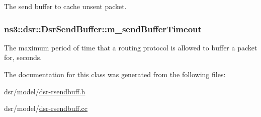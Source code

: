 The send buffer to cache unsent packet. 

\subsubsection[{\texorpdfstring{m\+\_\+send\+Buffer\+Timeout}{m_sendBufferTimeout}}]{ ns3\+::dsr\+::\+Dsr\+Send\+Buffer\+::m\+\_\+send\+Buffer\+Timeout\hspace{0.3cm}{\ttfamily [private]}}\hypertarget{classns3_1_1dsr_1_1DsrSendBuffer_a69009e6cefeda83be7eada52fdc8680e}{}\label{classns3_1_1dsr_1_1DsrSendBuffer_a69009e6cefeda83be7eada52fdc8680e}


The maximum period of time that a routing protocol is allowed to buffer a packet for, seconds. 



The documentation for this class was generated from the following files\+:\begin{DoxyCompactItemize}
\item 
dsr/model/\hyperlink{dsr-rsendbuff_8h}{dsr-\/rsendbuff.\+h}\item 
dsr/model/\hyperlink{dsr-rsendbuff_8cc}{dsr-\/rsendbuff.\+cc}\end{DoxyCompactItemize}

